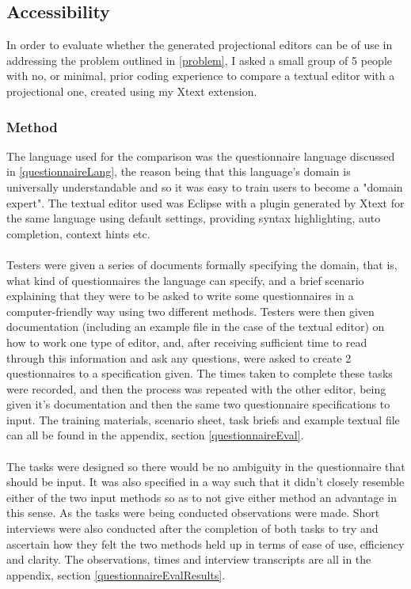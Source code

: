 \documentclass{article}
\begin{document}
\subsection{Accessibility}\label{Accessibility}
In order to evaluate whether the generated projectional editors can be of use in addressing the problem outlined in \ref{problem}, I asked a small group of 5 people with no, or minimal, prior coding experience to compare a textual editor with a projectional one, created using my Xtext extension.

\subsubsection{Method}
The language used for the comparison was the questionnaire language discussed in \ref{questionnaireLang}, the reason being that this language's domain is universally understandable and so it was easy to train users to become a "domain expert". The textual editor used was Eclipse with a plugin generated by Xtext for the same language using default settings, providing syntax highlighting, auto completion, context hints etc.
\\
\\
Testers were given a series of documents formally specifying the domain, that is, what kind of  questionnaires the language can specify, and a brief scenario explaining that they were to be asked to write some questionnaires in a computer-friendly way using two different methods. Testers were then given documentation (including an example file in the case of the textual editor) on how to work one type of editor, and, after receiving sufficient time to read through this information and ask any questions, were asked to create 2 questionnaires to a specification given. The times taken to complete these tasks were recorded, and then the process was repeated with the other editor, being given it's documentation and then the same two questionnaire specifications to input. The training materials, scenario sheet, task briefs and example textual file can all be found in the appendix, section \ref{questionnaireEval}.
\\
\\
The tasks were designed so there would be no ambiguity in the questionnaire that should be input. It was also specified in a way such that it didn't closely resemble either of the two input methods so as to not give either method an advantage in this sense. As the tasks were being conducted observations were made. Short interviews were also conducted after the completion of both tasks to try and ascertain how they felt the two methods held up in terms of ease of use, efficiency and clarity. The observations, times and interview transcripts are all in the appendix, section \ref{questionnaireEvalResults}.
\end{document}
